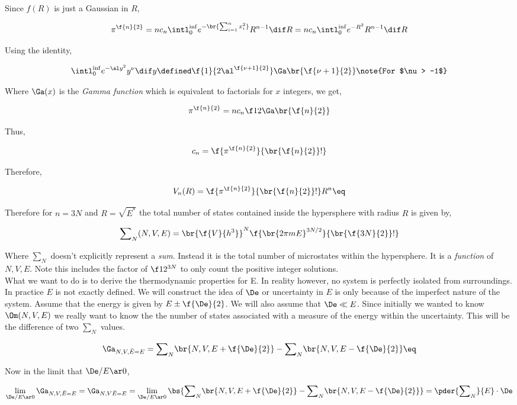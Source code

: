 \documentclass{article}
\begin{document}
Since $f(R)$ is just a Gaussian in $R$,

\[ \pi^{\f{n}{2}} = n c_n \intl_0^{\inf} e^{-\br{\sum_{i=1}^{n}x_i^2}} R^{n-1} \dif R = n c_n \intl_0^{\inf} e^{-R^2} R^{n-1} \dif R \]

Using the identity,

\[ \intl_0^{\inf} e^{-\al y^2} y^\nu \dif y \defined \f{1}{2\al^{\f{\nu+1}{2}}}  \Ga\br{\f{\nu +1}{2}} \note{For $\nu > -1$}\]

Where $\Ga(x)$ is the \textit{Gamma function} which is equivalent to factorials for $x$ integers, we get,

\[ \pi^{\f{n}{2}} = n c_n \f12 \Ga \br{\f{n}{2}} \]

Thus,

\[ c_n = \f{\pi^{\f{n}{2}}}{\br{\f{n}{2}}!} \]

Therefore,

\[ V_n (R) = \f{\pi^{\f{n}{2}}}{\br{\f{n}{2}}!} R^n \eq \label{eq:vn}\]

Therefore for $n = 3N$ and $R = \sqrt{E^*}$ the total number of states contained inside the hypersphere with radius $R$ is given by,

\[ {\sum}_N (N, V, E) = \br{\f{V}{h^3}}^N \f{\br{2\pi m E}^{3N/2}}{\br{\f{3N}{2}}!} \]

Where ${\sum}_N$ doesn't explicitly represent a \textit{sum}. Instead it is the total number of microstates within the hypersphere. It is a \textit{function} of $N, V, E$. Note this includes the factor of $\f12^{3N}$ to only count the positive integer solutions.\\

What we want to do is to derive the thermodynamic properties for E. In reality however, no system is perfectly isolated from surroundings. In practice $E$ is not exactly defined. We will construct the idea of $\De$ or uncertainty in $E$ is only because of the imperfect nature of the system. Assume that the energy is given by $E \pm \f{\De}{2}$. We will also assume that $\De \ll E$. Since initially we wanted to know $\Om(N, V, E)$ we really want to know the the number of states associated with a measure of the energy within the uncertainty. This will be the difference of two ${\sum}_N$ values.

\[ \Ga_{N, V, \bar{E} = E} = {\sum}_N \br{N, V, E + \f{\De}{2}} - {\sum}_N \br{N, V, E - \f{\De}{2}} \eq \label{eq:deltaE}\]

Now in the limit that $\De/E \ar 0$,

\[ \lim_{\De/E \ar 0} \Ga_{N, V, \bar{E} = E} = \Ga_{N, V \bar{E} = E} = \lim_{\De/E \ar 0} \bs{{\sum}_N \br{N, V, E + \f{\De}{2}} - {\sum}_N \br{N, V, E - \f{\De}{2}}} = \pder{{\sum}_N}{E} \cdot \De \]
\end{document}
